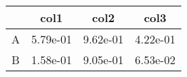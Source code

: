 \begin{tabular}{cccc}
\toprule
&col1&col2&col3\tabularnewline
\midrule
A&5.79e-01&9.62e-01&4.22e-01\tabularnewline
B&1.58e-01&9.05e-01&6.53e-02\tabularnewline
\bottomrule
\end{tabular}
